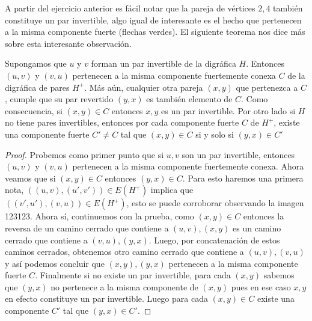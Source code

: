 A partir del ejercicio anterior es fácil notar que la pareja de vértices $2,4$ también constituye un par invertible, algo igual de interesante es el hecho que pertenecen a la misma componente fuerte (flechas verdes). El siguiente teorema nos dice más sobre esta interesante observación.

\begin{teorema}
\label{teo:PairDigrph}
    Supongamos que $u$ y $v$ forman un par invertible de la digráfica $H$. Entonces $(u,v)$ y $(v,u)$ pertenecen a la misma componente fuertemente conexa $C$ de la digráfica de pares $H^+$. Más aún, cualquier otra pareja $(x,y)$ que pertenezca a $C$, cumple que su par revertido $(y,x)$ es también elemento de $C$.  Como consecuencia, si $(x,y) \in C$ entonces $x,y$ es un par invertible. Por otro lado si $H$ no tiene pares invertibles, entonces por cada componente fuerte $C$ de $H^+$, existe una componente fuerte $C' \neq C$ tal que $(x,y)\in C $ si y solo si $(y,x)\in C'$
\end{teorema}

\begin{proof}
    Probemos como primer punto que si $u,v$ son un par invertible, entonces $(u,v)$ y $(v,u)$ pertenecen a la misma componente fuertemente conexa.
    Ahora veamos que si $(x,y)\in C$ entonces $(y,x)\in C$. Para esto haremos una primera nota, $((u,v),(u',v'))\in E(H^+)$ implica que $((v',u'),(v,u))\in E(H^+)$, esto se puede corroborar observando la imagen 123123. Ahora sí, continuemos con la prueba, como $(x,y) \in C$ entonces la reversa de un camino cerrado que contiene a $(u,v),(x,y)$ es un camino cerrado que contiene a $(v,u),(y,x)$.    Luego, por concatenación de estos caminos cerrados, obtenemos otro camino cerrado que contiene a $(u,v),(v,u)$ y así podemos concluir que $(x,y),(y,x)$ pertenecen a la misma componente fuerte $C$.
    Finalmente si no existe un par invertible, para cada $(x,y)$ sabemos que $(y,x)$ no pertenece a la misma componente de $(x,y)$ pues en ese caso $x,y$ en efecto constituye un par invertible. Luego para cada $(x,y)\in C$ existe una componente $C'$ tal que $(y,x)\in C'$. 
\end{proof}

